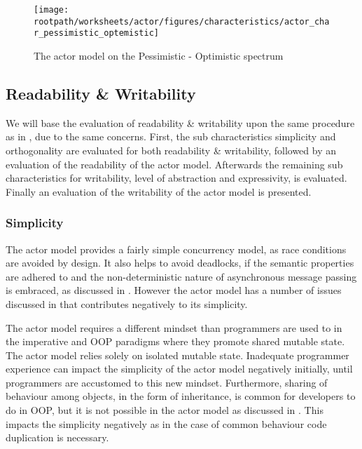 \begin{figure}[htbp]
\centering
 \texttt{[image: \\rootpath/worksheets/actor/figures/characteristics/actor\_char\_pessimistic\_optemistic]} 
 \caption{The actor model on the Pessimistic - Optimistic spectrum}
\label{fig:actor_pes_opti}
\end{figure}

\subsection{Readability \& Writability}
We will base the evaluation of readability \& writability upon the same procedure as in , due to the same concerns. First, the sub characteristics simplicity and orthogonality are evaluated for both readability \& writability, followed by an evaluation of the readability of the actor model. Afterwards the remaining sub characteristics for writability, level of abstraction and expressivity, is evaluated. Finally an evaluation of the writability of the actor model is presented.

\subsubsection{Simplicity}\label{subsec:actor_simplicity_read}
The actor model provides a fairly simple concurrency model, as race conditions are avoided by design. It also helps to avoid deadlocks, if the semantic properties are adhered to and the non-deterministic nature of asynchronous message passing is embraced, as discussed in . However the actor model has a number of issues discussed in  that contributes negatively to its simplicity.

The actor model requires a different mindset than programmers are used to in the imperative and \ac{OOP} paradigms where they promote shared mutable state. The actor model relies solely on isolated mutable state. Inadequate programmer experience can impact the simplicity of the actor model negatively initially, until programmers are accustomed to this new mindset. Furthermore, sharing of behaviour among objects, in the form of inheritance, is common for developers to do in \ac{OOP}, but it is not possible in the actor model as discussed in . This impacts the simplicity negatively as in the case of common behaviour code duplication is necessary.

